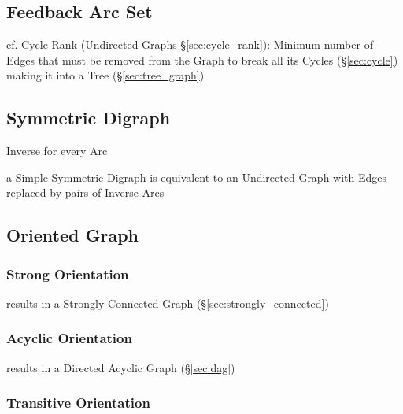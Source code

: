 \subsection{Feedback Arc Set}\label{sec:feedback_arc_set}

\fist cf. Cycle Rank (Undirected Graphs \S\ref{sec:cycle_rank}): Minimum number
of Edges that must be removed from the Graph to break all its Cycles
(\S\ref{sec:cycle}) making it into a Tree (\S\ref{sec:tree_graph})




\subsection{Symmetric Digraph}\label{sec:symmetric_digraph}

Inverse for every Arc

a Simple Symmetric Digraph is equivalent to an Undirected Graph with
Edges replaced by pairs of Inverse Arcs



\subsection{Oriented Graph}\label{sec:oriented_graph}

\subsubsection{Strong Orientation}\label{sec:strong_orientation}

results in a Strongly Connected Graph (\S\ref{sec:strongly_connected})



\subsubsection{Acyclic Orientation}\label{sec:acyclic_orientation}

results in a Directed Acyclic Graph (\S\ref{sec:dag})



\subsubsection{Transitive Orientation}\label{sec:transitive_orientation}

